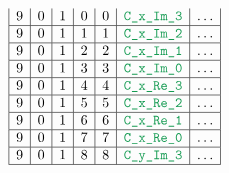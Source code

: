 \begin{figure}[h!]
\begin{adjustwidth}{-2cm}{-2cm}
{\[\begin{array}{|c|c|c|c|c|c|c|}
                    9                      & 0                                       & 1                                         & 0                      & 0                   & \locCXImThree & \hdots                                                               \\ \hline
                    9                      & 0                                       & 1                                         & 1                      & 1                   & \locCXImTwo   & \hdots                                                               \\ \hline
                    9                      & 0                                       & 1                                         & 2                      & 2                   & \locCXImOne   & \hdots                                                               \\ \hline
                    9                      & 0                                       & 1                                         & 3                      & 3                   & \locCXImZero  & \hdots                                                               \\ \hline
                    9                      & 0                                       & 1                                         & 4                      & 4                   & \locCXReThree & \hdots                                                               \\ \hline
                    9                      & 0                                       & 1                                         & 5                      & 5                   & \locCXReTwo   & \hdots                                                               \\ \hline
                    9                      & 0                                       & 1                                         & 6                      & 6                   & \locCXReOne   & \hdots                                                               \\ \hline
                    9                      & 0                                       & 1                                         & 7                      & 7                   & \locCXReZero  & \hdots                                                               \\ \hline
                    9                      & 0                                       & 1                                         & 8                      & 8                   & \locCYImThree & \hdots                                                               \\ \hline

\end{array}\]}
\end{adjustwidth}
\end{figure}
